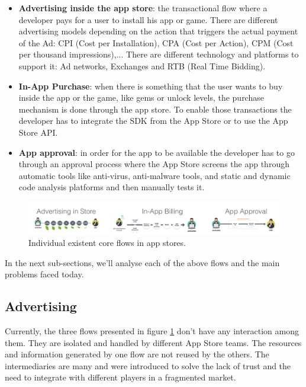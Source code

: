 \begin{itemize}
\item {\bf Advertising inside the app store}: the transactional flow where a developer pays for a user to install his app or game. There are different advertising models depending on the action that triggers the actual payment of the Ad: CPI (Cost per Installation), CPA (Cost per Action), CPM (Cost per thousand impressions),... There are different technology and platforms to support it: Ad networks, Exchanges and RTB (Real Time Bidding).
\item {\bf In-App Purchase}: when there is something that the user wants to buy inside the app or the game, like gems or unlock levels, the purchase mechanism is done through the app store. To enable those transactions the developer has to integrate the SDK from the App Store or to use the App Store API.
\item {\bf App approval}: in order for the app to be available the developer has to go through an approval process where the App Store screens the app through automatic tools like anti-virus, anti-malware tools, and static and dynamic code analysis platforms and then manually tests it.
\end{itemize}


\begin{figure}[!ht]
\centering
\includegraphics[width=\textwidth]{diagrams/current_flows.png}
\caption{Individual existent core flows in app stores.}
\label{fig:exist_flows}
\end{figure}


In the next sub-sections, we'll analyse each of the above flows and the main problems faced today.

\subsection{Advertising}


Currently, the three flows presented in figure \ref{fig:exist_flows} don't have any interaction among them. They are isolated and handled by different App Store teams. The resources and information generated by one flow are not reused by the others. The intermediaries are many and were introduced to solve the lack of trust and the need to integrate with different players in a fragmented market.  

